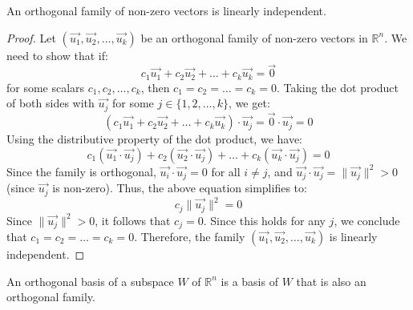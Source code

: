 \begin{theorem}
    An orthogonal family of non-zero vectors is linearly independent.
\end{theorem}
\begin{proof}
    Let $(\vec{u_1}, \vec{u_2}, \ldots, \vec{u_k})$ be an orthogonal family of non-zero vectors in $\mathbb{R}^n$. We need to show that if:
    \[
        c_1 \vec{u_1} + c_2 \vec{u_2} + \ldots + c_k \vec{u_k} = \vec{0}
    \]
    for some scalars $c_1, c_2, \ldots, c_k$, then $c_1 = c_2 = \ldots = c_k = 0$.
    Taking the dot product of both sides with $\vec{u_j}$ for some $j \in \{1, 2, \ldots, k\}$, we get:
    \[
        (c_1 \vec{u_1} + c_2 \vec{u_2} + \ldots + c_k \vec{u_k}) \cdot \vec{u_j} = \vec{0} \cdot \vec{u_j} = 0
    \]
    Using the distributive property of the dot product, we have:
    \[
        c_1 (\vec{u_1} \cdot \vec{u_j}) + c_2 (\vec{u_2} \cdot \vec{u_j}) + \ldots + c_k (\vec{u_k} \cdot \vec{u_j}) = 0
    \]
    Since the family is orthogonal, $\vec{u_i} \cdot \vec{u_j} = 0$ for all $i \neq j$, and $\vec{u_j} \cdot \vec{u_j} = \|\vec{u_j}\|^2 > 0$ (since $\vec{u_j}$ is non-zero). Thus, the above equation simplifies to:
    \[
        c_j \|\vec{u_j}\|^2 = 0
    \]
    Since $\|\vec{u_j}\|^2 > 0$, it follows that $c_j = 0$.
    Since this holds for any $j$, we conclude that $c_1 = c_2 = \ldots = c_k = 0$.
    Therefore, the family $(\vec{u_1}, \vec{u_2}, \ldots, \vec{u_k})$ is linearly independent.
\end{proof}

\begin{definition}
    An orthogonal basis of a subspace $W$ of $\mathbb{R}^n$ is a basis of $W$ that is also an orthogonal family.
\end{definition}

